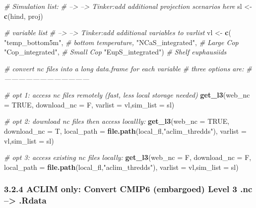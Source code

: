 \documentclass[
]{article}
\newenvironment{Shaded}{\begin{snugshade}}{\end{snugshade}}
\newcommand{\CommentTok}[1]{\textcolor[rgb]{0.56,0.35,0.01}{\textit{#1}}}
\newcommand{\DataTypeTok}[1]{\textcolor[rgb]{0.13,0.29,0.53}{#1}}
\newcommand{\KeywordTok}[1]{\textcolor[rgb]{0.13,0.29,0.53}{\textbf{#1}}}
\newcommand{\NormalTok}[1]{#1}
\newcommand{\OtherTok}[1]{\textcolor[rgb]{0.56,0.35,0.01}{#1}}
\newcommand{\StringTok}[1]{\textcolor[rgb]{0.31,0.60,0.02}{#1}}
\begin{document}
\begin{Shaded}
\begin{Highlighting}[]
    \CommentTok{# Simulation list:}
    \CommentTok{# --> --> Tinker:add additional projection scenarios here}
\NormalTok{    sl <-}\StringTok{ }\KeywordTok{c}\NormalTok{(hind, proj)}
    
    \CommentTok{# variable list}
    \CommentTok{# --> --> Tinker:add additional variables to varlist}
\NormalTok{    vl <-}\StringTok{ }\KeywordTok{c}\NormalTok{(}
              \StringTok{"temp_bottom5m"}\NormalTok{,    }\CommentTok{# bottom temperature,}
              \StringTok{"NCaS_integrated"}\NormalTok{,  }\CommentTok{# Large Cop}
              \StringTok{"Cop_integrated"}\NormalTok{,   }\CommentTok{# Small Cop}
              \StringTok{"EupS_integrated"}\NormalTok{)  }\CommentTok{# Shelf  euphausiids}
    
    \CommentTok{# convert  nc files into a long data.frame for each variable}
    \CommentTok{# three options are:}
    \CommentTok{# ------------------------------------}
    
    \CommentTok{# opt 1: access nc files remotely (fast, less local storage needed)}
    \KeywordTok{get_l3}\NormalTok{(}\DataTypeTok{web_nc =} \OtherTok{TRUE}\NormalTok{, }\DataTypeTok{download_nc =}\NormalTok{ F,}
          \DataTypeTok{varlist =}\NormalTok{ vl,}\DataTypeTok{sim_list =}\NormalTok{ sl)}
    
    \CommentTok{# opt 2:  download nc files then access locallly:}
    \KeywordTok{get_l3}\NormalTok{(}\DataTypeTok{web_nc =} \OtherTok{TRUE}\NormalTok{, }\DataTypeTok{download_nc =}\NormalTok{ T,}
          \DataTypeTok{local_path =} \KeywordTok{file.path}\NormalTok{(local_fl,}\StringTok{"aclim_thredds"}\NormalTok{),}
          \DataTypeTok{varlist =}\NormalTok{ vl,}\DataTypeTok{sim_list =}\NormalTok{ sl)}
    
     \CommentTok{# opt 3:  access existing nc files locally:}
    \KeywordTok{get_l3}\NormalTok{(}\DataTypeTok{web_nc =}\NormalTok{ F, }\DataTypeTok{download_nc =}\NormalTok{ F,}
          \DataTypeTok{local_path =} \KeywordTok{file.path}\NormalTok{(local_fl,}\StringTok{"aclim_thredds"}\NormalTok{),}
          \DataTypeTok{varlist =}\NormalTok{ vl,}\DataTypeTok{sim_list =}\NormalTok{ sl)}
\end{Highlighting}
\end{Shaded}

\hypertarget{aclim-only-convert-cmip6-embargoed-level-3-.nc-.rdata}{%
\subsubsection{3.2.4 ACLIM only: Convert CMIP6 (embargoed) Level 3 .nc
--\textgreater{}
.Rdata}\label{aclim-only-convert-cmip6-embargoed-level-3-.nc-.rdata}}
\end{document}
